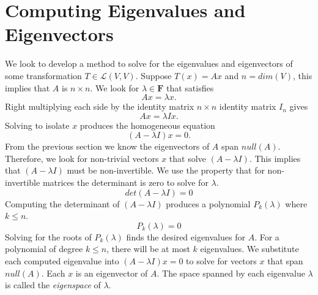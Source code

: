 {\section{Computing Eigenvalues and Eigenvectors}
We look to develop a method to solve for the eigenvalues and eigenvectors of some transformation $T \in \mathcal{L}(V,V)$. Suppose $T(x) = Ax$ and $n = dim(V)$, this implies that $A$ is $n \times n$. We look for $\lambda \in \mathbf{F}$ that satisfies
\[Ax = \lambda x.\]
Right multiplying each side by the identity matrix $n \times n$ identity matrix $I_n$ gives
\[Ax = \lambda Ix.\]
Solving to isolate $x$ produces the homogeneous equation
\[(A - \lambda I)x = 0.\]
From the previous section we know the eigenvectors of $A$ span $null(A)$. Therefore, we look for non-trivial vectors $x$ that solve $(A-\lambda I)$. This implies that $(A-\lambda I)$ must be non-invertible. We use the property that for non-invertible matrices the determinant is zero to solve for $\lambda$. 
\[det(A-\lambda I) = 0\]
Computing the determinant of $(A-\lambda I)$ produces a polynomial $P_k(\lambda)$ where $k \leq n$.
\[P_k(\lambda) = 0\]
Solving for the roots of $P_k(\lambda)$ finds the desired eigenvalues for $A$. For a polynomial of degree $k \leq n$, there will be at most $k$ eigenvalues. We substitute each computed eigenvalue into $(A-\lambda I)x = 0$ to solve for vectors $x$ that span $null(A)$. Each $x$ is an eigenvector of $A$. The space spanned by each eigenvalue $\lambda$ is called the \textit{eigenspace} of $\lambda$.
}
